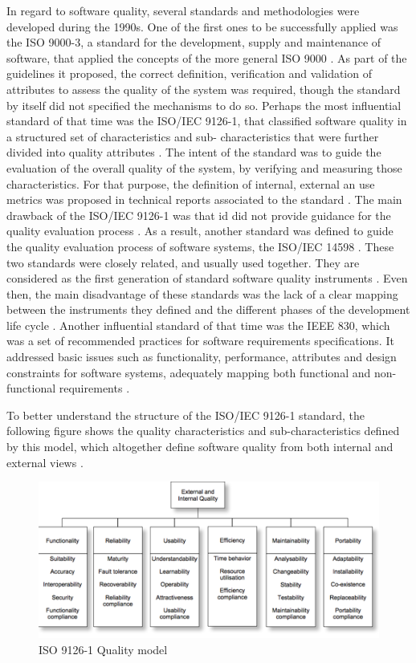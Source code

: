 \documentclass[10pt]{article}
\begin{document}
In regard to software quality, several standards and methodologies were developed during the 1990s. One of the first ones to be successfully applied was the ISO 9000-3, a standard for the development, supply and maintenance of software, that applied the concepts of the more general ISO 9000 \cite{Jarvis95}. As part of the guidelines it proposed, the correct definition, verification and validation of attributes to assess the quality of the system was required, though the standard by itself did not specified the mechanisms to do so. Perhaps the most influential standard of that time was the ISO/IEC 9126-1, that classified software quality in a structured set of characteristics and sub- characteristics that were further divided into quality attributes \cite{ISO07}. The intent of the standard was to guide the evaluation of the overall quality of the system, by verifying and measuring those characteristics. For that purpose, the definition of internal, external an use metrics was proposed in technical reports associated to the standard \cite{ISO07}. The main drawback of the ISO/IEC 9126-1 was that id did not provide guidance for the quality evaluation process \cite{Suryn03}. As a result, another standard was defined to guide the quality evaluation process of software systems, the ISO/IEC 14598 \cite{Suryn03}. These two standards were closely related, and usually used together. They are considered as the first generation of standard software quality instruments \cite{Suryn03}. Even then, the main disadvantage of these standards was the lack of a clear mapping between the instruments they defined and the different phases of the development life cycle \cite{Suryn03}. Another influential standard of that time was the IEEE 830, which was a set of recommended practices for software requirements specifications. It addressed basic issues such as functionality, performance, attributes and design constraints for software systems, adequately mapping both functional and non-functional requirements \cite{Dorfmann94}.

To better understand the structure of the ISO/IEC 9126-1 standard, the following figure shows the quality characteristics and sub-characteristics defined by this model, which altogether define software quality from both internal and external views \cite{ISO07}.

\begin{figure}[htbp]
	\centering
		\includegraphics[scale=0.55]{img/ISO_9126_1_Quality_model.png}
	\caption{ISO 9126-1 Quality model}
	\label{fig:ISO_9126_1_Quality_model}
\end{figure}
\end{document}
